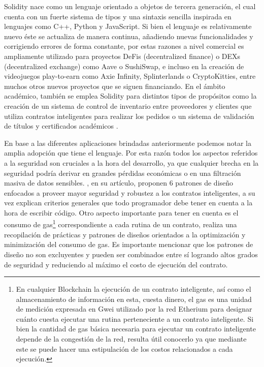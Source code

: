 \documentclass[a4paper,10pt]{article}
\begin{document}
	Solidity nace como un lenguaje orientado a objetos de tercera generación, el cual cuenta con un fuerte sistema de tipos y una sintaxis sencilla inspirada en lenguajes como C++, Python y JavaScript. Si bien el lenguaje es relativamente nuevo éste se actualiza de manera continua, añadiendo nuevas funcionalidades y corrigiendo errores de forma constante, por estas razones a nivel comercial es ampliamente utilizado para proyectos DeFis (decentralized finance) o DEXs (decentralized exchange) como Aave o SushiSwap, e incluso en la creación de videojuegos play-to-earn como Axie Infinity, Splinterlands o CryptoKitties, entre muchos otros nuevos proyectos que se siguen financiando. En el ámbito académico, también se emplea Solidity para distintos tipos de propósitos como la creación de un sistema de control de inventario entre proveedores y clientes que utiliza contratos inteligentes para realizar los pedidos \parencite{omar2021supply} o un sistema de validación de títulos y certificados académicos \parencite{bousaba2019degree}.
	
	En base a las diferentes aplicaciones brindadas anteriormente podemos notar la amplia adopción que tiene el lenguaje. Por esta razón todos los aspectos referidos a la seguridad son cruciales a la hora del desarrollo, ya que cualquier brecha en la seguridad podría derivar en grandes pérdidas económicas o en una filtración masiva de datos sensibles. \textcite{wohrer2018smart}, en su artículo, proponen 6 patrones de diseño enfocados a proveer mayor seguridad y robustez a los contratos inteligentes, a su vez explican criterios generales que todo programador debe tener en cuenta a la hora de escribir código. Otro aspecto importante para tener en cuenta es el consumo de gas\footnote{En cualquier Blockchain la ejecución de un contrato inteligente, así como el almacenamiento de información en esta, cuesta dinero, el gas es una unidad de medición expresada en Gwei utilizado por la red Etherium para designar cuánto cuesta ejecutar una rutina perteneciente a un contrato inteligente. Si bien la cantidad de gas básica necesaria para ejecutar un contrato inteligente depende de la congestión de la red, resulta útil conocerlo ya que mediante este se puede hacer una estipulación de los costos relacionados a cada ejecución.} correspondiente a cada rutina de un contrato, \textcite{marchesi2020design} realiza una recopilación de prácticas y patrones de diseños orientados a la optimización y minimización del consumo de gas. Es importante mencionar que los patrones de diseño no son excluyentes y pueden ser combinados entre sí logrando altos grados de seguridad y reduciendo al máximo el costo de ejecución del contrato.
	
\end{document}
